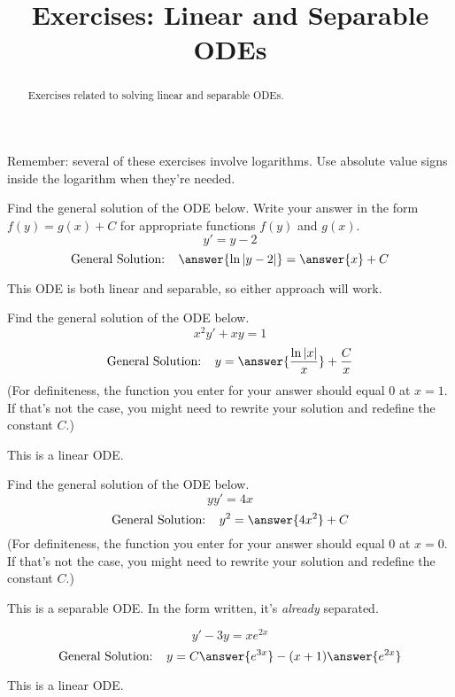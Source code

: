 \documentclass{ximera}
\title{Exercises: Linear and Separable ODEs}
\begin{document}
\begin{abstract}
Exercises related to solving linear and separable ODEs.
\end{abstract}
\maketitle


Remember: several of these exercises involve logarithms. Use absolute value signs inside the logarithm when they're needed.

\begin{exercise}%
Find the general solution of the ODE below. Write your answer in the form $f(y) = g(x) + C$ for appropriate functions $f(y)$ and $g(x)$.
\[ y' = y - 2 \]
\[ \text{General Solution: } \ \ \answer{\ln |y-2|} = \answer{x} + C \]
\begin{hint}
This ODE is both linear and separable, so either approach will work.
\end{hint}
\end{exercise}

\begin{exercise}%
Find the general solution of the ODE below.
\[ x^2 y' + xy = 1 \]
\[ \text{General Solution: } \ \  y = \answer{\frac{\ln |x|}{x}} + \frac{C}{x} \]
(For definiteness, the function you enter for your answer should equal $0$ at $x=1$. If that's not the case, you might need to rewrite your solution and redefine the constant $C$.)
\begin{hint}
This is a linear ODE.
\end{hint}
\end{exercise}

\begin{exercise}%
Find the general solution of the ODE below.
\[ y y' = 4x \]
\[ \text{General Solution: } \ \  y^2 =  \answer{4 x^2} + C \]
(For definiteness, the function you enter for your answer should equal $0$ at $x=0$. If that's not the case, you might need to rewrite your solution and redefine the constant $C$.)
\begin{hint}
This is a separable ODE. In the form written, it's \textit{already} separated.
\end{hint}
\end{exercise}

\begin{exercise}%
\[ y'-3y=xe^{2x} \]
\[ \text{General Solution: } \ \  y = C\answer{e^{3x}}-(x+1)\answer{e^{2x}} \]
\begin{hint}
This is a linear ODE.
\end{hint}
\end{exercise}
\end{document}
